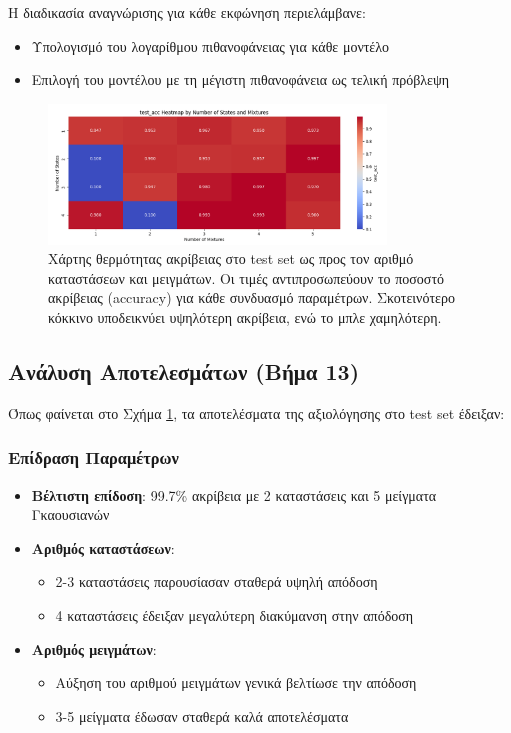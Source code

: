 \documentclass[a4paper,12pt]{article}
\begin{document}
Η διαδικασία αναγνώρισης για κάθε εκφώνηση περιελάμβανε:
\begin{itemize}
    \item Υπολογισμό του λογαρίθμου πιθανοφάνειας για κάθε μοντέλο
    \item Επιλογή του μοντέλου με τη μέγιστη πιθανοφάνεια ως τελική πρόβλεψη
\end{itemize}

\begin{figure}[h]
    \centering
    \includegraphics[width=0.8\textwidth]{hmm_test_acc_heatmap.png}
    \caption{Χάρτης θερμότητας ακρίβειας στο test set ως προς τον αριθμό καταστάσεων και μειγμάτων. 
    Οι τιμές αντιπροσωπεύουν το ποσοστό ακρίβειας (accuracy) για κάθε συνδυασμό παραμέτρων. 
    Σκοτεινότερο κόκκινο υποδεικνύει υψηλότερη ακρίβεια, ενώ το μπλε χαμηλότερη.}
    \label{fig:test_acc_heatmap}
\end{figure}

\subsection*{Ανάλυση Αποτελεσμάτων (Βήμα 13)}
Όπως φαίνεται στο Σχήμα \ref{fig:test_acc_heatmap}, τα αποτελέσματα της αξιολόγησης στο test set έδειξαν:

\subsubsection*{Επίδραση Παραμέτρων}
\begin{itemize}
    \item \textbf{Βέλτιστη επίδοση}: 99.7\% ακρίβεια με 2 καταστάσεις και 5 μείγματα Γκαουσιανών
    \item \textbf{Αριθμός καταστάσεων}:
          \begin{itemize}
              \item 2-3 καταστάσεις παρουσίασαν σταθερά υψηλή απόδοση
              \item 4 καταστάσεις έδειξαν μεγαλύτερη διακύμανση στην απόδοση
          \end{itemize}
    \item \textbf{Αριθμός μειγμάτων}:
          \begin{itemize}
              \item Αύξηση του αριθμού μειγμάτων γενικά βελτίωσε την απόδοση
              \item 3-5 μείγματα έδωσαν σταθερά καλά αποτελέσματα
          \end{itemize}
\end{itemize}
\end{document}
